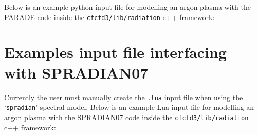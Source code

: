 Below is an example python input file for modelling an argon plasma with the PARADE code inside the \texttt{cfcfd3/lib/radiation} c++ framework:

\noindent \topbar

\bottombar

\section{Examples input file interfacing with SPRADIAN07}
\label{sec:spradian_input}

Currently the user must manually create the \texttt{.lua} input file when using the `\texttt{spradian}' spectral model.
Below is an example Lua input file for modelling an argon plasma with the SPRADIAN07 code inside the \texttt{cfcfd3/lib/radiation} c++ framework:

 \noindent \topbar

\bottombar
